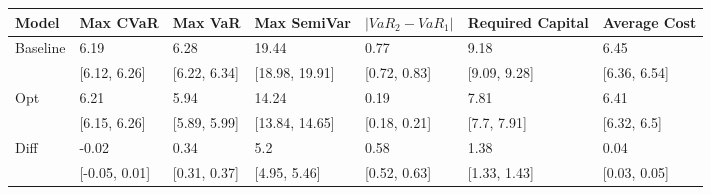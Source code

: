 \begin{tabular}{lllllll}
\toprule
   Model &      Max CVaR &      Max VaR &    Max SemiVar & $|VaR_2 - VaR_1|$ & Required Capital & Average Cost \\
\midrule
Baseline &          6.19 &         6.28 &          19.44 &              0.77 &             9.18 &         6.45 \\
         &  [6.12, 6.26] & [6.22, 6.34] & [18.98, 19.91] &      [0.72, 0.83] &     [9.09, 9.28] & [6.36, 6.54] \\
     Opt &          6.21 &         5.94 &          14.24 &              0.19 &             7.81 &         6.41 \\
         &  [6.15, 6.26] & [5.89, 5.99] & [13.84, 14.65] &      [0.18, 0.21] &      [7.7, 7.91] &  [6.32, 6.5] \\
    Diff &         -0.02 &         0.34 &            5.2 &              0.58 &             1.38 &         0.04 \\
         & [-0.05, 0.01] & [0.31, 0.37] &   [4.95, 5.46] &      [0.52, 0.63] &     [1.33, 1.43] & [0.03, 0.05] \\
\bottomrule
\end{tabular}
